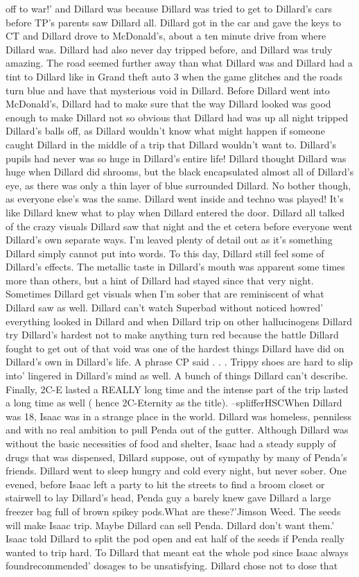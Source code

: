 \documentclass[12pt]{book}
\begin{document}
off to war!' and Dillard was because Dillard was tried to get to Dillard's cars before TP's parents saw Dillard all. Dillard got in the car and gave the keys to CT and Dillard drove to McDonald's, about a ten minute drive from where Dillard was. Dillard had also never day tripped before, and Dillard was truly amazing. The road seemed further away than what Dillard was and Dillard had a tint to Dillard like in Grand theft auto 3 when the game glitches and the roads turn blue and have that mysterious void in Dillard. Before Dillard went into McDonald's, Dillard had to make sure that the way Dillard looked was good enough to make Dillard not so obvious that Dillard had was up all night tripped Dillard's balls off, as Dillard wouldn't know what might happen if someone caught Dillard in the middle of a trip that Dillard wouldn't want to. Dillard's pupils had never was so huge in Dillard's entire life! Dillard thought Dillard was huge when Dillard did shrooms, but the black encapsulated almost all of Dillard's eye, as there was only a thin layer of blue surrounded Dillard. No bother though, as everyone else's was the same. Dillard went inside and techno was played! It's like Dillard knew what to play when Dillard entered the door. Dillard all talked of the crazy visuals Dillard saw that night and the et cetera before everyone went Dillard's own separate ways. I'm leaved plenty of detail out as it's something Dillard simply cannot put into words. To this day, Dillard still feel some of Dillard's effects. The metallic taste in Dillard's mouth was apparent some times more than others, but a hint of Dillard had stayed since that very night. Sometimes Dillard get visuals when I'm sober that are reminiscent of what Dillard saw as well. Dillard can't watch Superbad without noticed howred' everything looked in Dillard and when Dillard trip on other hallucinogens Dillard try Dillard's hardest not to make anything turn red because the battle Dillard fought to get out of that void was one of the hardest things Dillard have did on Dillard's own in Dillard's life. A phrase CP said . . . Trippy shoes are hard to slip into' lingered in Dillard's mind as well. A bunch of things Dillard can't describe. Finally, 2C-E lasted a REALLY long time and the intense part of the trip lasted a long time as well ( hence 2C-Eternity as the title). --splifferHSCWhen Dillard was 18, Isaac was in a strange place in the world. Dillard was homeless, penniless and with no real ambition to pull Penda out of the gutter. Although Dillard was without the basic necessities of food and shelter, Isaac had a steady supply of drugs that was dispensed, Dillard suppose, out of sympathy by many of Penda's friends. Dillard went to sleep hungry and cold every night, but never sober. One evened, before Isaac left a party to hit the streets to find a broom closet or stairwell to lay Dillard's head, Penda guy a barely knew gave Dillard a large freezer bag full of brown spikey pods.What are these?'Jimson Weed. The seeds will make Isaac trip. Maybe Dillard can sell Penda. Dillard don't want them.' Isaac told Dillard to split the pod open and eat half of the seeds if Penda really wanted to trip hard. To Dillard that meant eat the whole pod since Isaac always foundrecommended' dosages to be unsatisfying. Dillard chose not to dose that 
\end{document}
